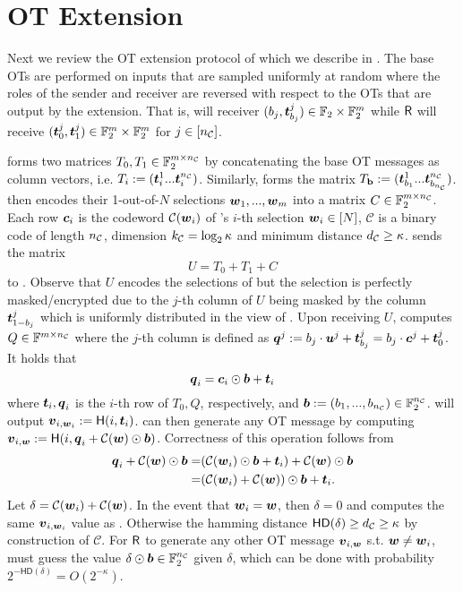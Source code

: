 


\section{OT Extension} \label{sec:otext}


Next we review the OT extension protocol of \cite{RSA:OrrOrsSch17} which we describe in . The base OTs are performed on inputs that are sampled uniformly at random where the roles of the sender and receiver are reversed with respect to the OTs that are output by the extension. That is, \send will receiver $(b_j, \tt^j_{b_j})\in\mathbb{F}_2\times \mathbb{F}_2^m$ while $\rec$ will receive $(\tt^j_0,\tt^j_1)\in\mathbb{F}_2^m\times \mathbb{F}_2^m$ for $j\in[\nc]$.

\rec forms two matrices $T_0,T_1\in \mathbb{F}_2^{m\times \nc}$ by concatenating the base OT messages as column vectors, i.e. $T_i:=(\tt^1_i ... \tt^\nc_i)$. Similarly, \send forms the matrix $T_{\text{\textbf{b}}}:=(\tt^1_{b_1}...\tt^\nc_{b_\nc})$. \rec then encodes their 1-out-of-$N$ selections $\ww_1,...,\ww_m$ into a matrix $C\in \mathbb{F}_2^{m\times \nc}$. Each row $\cc_i$ is the codeword $\mathcal{C}(\ww_i)$ of \rec's $i$-th selection $\ww_i\in [N]$, $\mathcal{C}$ is a binary code of length $\nc$, dimension $\kc=\log_2\kappa$ and minimum distance $\dc\geq\kappa$. \rec sends the matrix
$$
	U=T_0+T_1+C
$$
to \send. Observe that $U$ encodes the selections of \rec but the selection is perfectly masked/encrypted due to the $j$-th column of $U$ being masked by the column $\tt^j_{1-b_j}$ which is uniformly distributed in the view of \send. Upon receiving $U$, \send computes $Q\in\mathbb{F}^{m\times\nc}$ where the $j$-th column is defined as $\qq^j:=b_j\cdot \uu^j+\tt^j_{b_j}=b_j\cdot \cc^j+\tt^j_0$. It holds that 
$$
	\qq_i=\cc_i\odot \bb + \tt_i
$$
where $\tt_i,\qq_i$ is the $i$-th row of $T_0,Q$, respectively, and $\bb:=(b_1,...,b_\nc)\in \mathbb{F}^\nc_2$. \rec will output $\vv_{i,\ww_i}:=\H(i, \tt_i)$. \send can then generate any OT message by computing $\vv_{i,\ww}:=\H(i, \qq_i + \mathcal{C}(\ww)\odot \bb)$. Correctness of this operation follows from 
\begin{align*}
	\qq_i + \mathcal{C}(\ww)\odot \bb =&  (\mathcal{C}(\ww_i)\odot \bb + \tt_i) + \mathcal{C}(\ww)\odot \bb\\
	=& (\mathcal{C}(\ww_i) + \mathcal{C}(\ww)) \odot \bb +\tt_i.
\end{align*}
Let $\delta = \mathcal{C}(\ww_i) + \mathcal{C}(\ww)$. In the event that $\ww_i=\ww$, then $\delta=0$ and \send computes the same $\vv_{i,\ww_i}$ value as \rec. Otherwise the hamming distance $\textsf{HD}(\delta)\geq \dc\geq \kappa$ by construction of $\mathcal{C}$. For $\rec$ to generate any other OT message $\vv_{i,\ww}$ s.t. $\ww\neq \ww_i$, \rec must guess the value $\delta\odot \bb\in \mathbb{F}^\nc_2$ given $\delta$, which can be done with probability $2^{-\textsf{HD}(\delta)}=O(2^{-\kappa})$.

